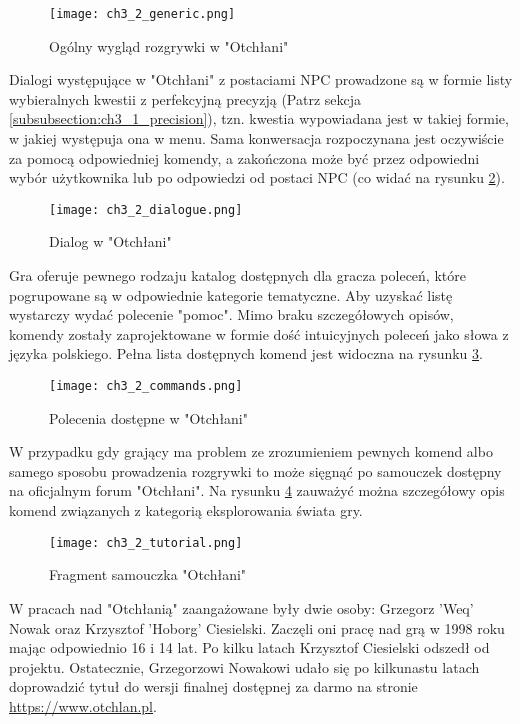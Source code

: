 \begin{figure}[h]
    \texttt{[image: ch3\_2\_generic.png]}
    \caption{Ogólny wygląd rozgrywki w "Otchłani"}
    \centering
    \label{fig:ch3_2_generic}
\end{figure}

Dialogi występujące w "Otchłani" z postaciami NPC prowadzone są w formie listy wybieralnych kwestii
z perfekcyjną precyzją (Patrz sekcja \ref{subsubsection:ch3_1_precision}), tzn. kwestia wypowiadana
jest w takiej formie, w jakiej występuja ona w menu. Sama konwersacja rozpoczynana jest oczywiście
za pomocą odpowiedniej komendy, a zakończona może być przez odpowiedni wybór użytkownika lub po
odpowiedzi od postaci NPC (co widać na rysunku \ref{fig:ch3_2_dialogue}).

\begin{figure}[h]
    \texttt{[image: ch3\_2\_dialogue.png]}
    \caption{Dialog w "Otchłani"}
    \centering
    \label{fig:ch3_2_dialogue}
\end{figure}

Gra oferuje pewnego rodzaju katalog dostępnych dla gracza poleceń, które pogrupowane są w
odpowiednie kategorie tematyczne. Aby uzyskać listę wystarczy wydać polecenie "pomoc". Mimo braku
szczegółowych opisów, komendy zostały zaprojektowane w formie dość intuicyjnych poleceń jako słowa
z języka polskiego. Pełna lista dostępnych komend jest widoczna na rysunku \ref{fig:ch3_2_commands}.

\begin{figure}[h]
    \texttt{[image: ch3\_2\_commands.png]}
    \caption{Polecenia dostępne w "Otchłani"}
    \centering
    \label{fig:ch3_2_commands}
\end{figure}

W przypadku gdy grający ma problem ze zrozumieniem pewnych komend albo samego sposobu prowadzenia
rozgrywki to może sięgnąć po samouczek dostępny na oficjalnym forum "Otchłani". Na rysunku
\ref{fig:ch3_2_tutorial} zauważyć można szczegółowy opis komend związanych z kategorią
eksplorowania świata gry.

\begin{figure}[h]
    \texttt{[image: ch3\_2\_tutorial.png]}
    \caption{Fragment samouczka "Otchłani"}
    \centering
    \label{fig:ch3_2_tutorial}
\end{figure}

W pracach nad "Otchłanią" zaangażowane były dwie osoby: Grzegorz 'Weq' Nowak oraz Krzysztof 'Hoborg'
Ciesielski. Zaczęli oni pracę nad grą w 1998 roku mając odpowiednio 16 i 14 lat\cite{otchlan_historia}.
Po kilku latach Krzysztof Ciesielski odszedł od projektu. Ostatecznie, Grzegorzowi Nowakowi udało się
po kilkunastu latach doprowadzić tytuł do wersji finalnej dostępnej za darmo na stronie
\href{https://www.otchlan.pl}{https://www.otchlan.pl}.